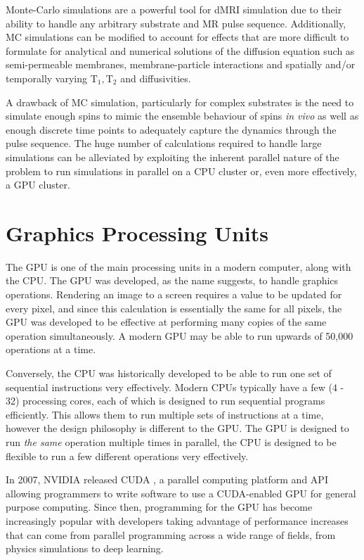 Monte-Carlo simulations are a powerful tool for \ac{dMRI} simulation due to their ability to handle any arbitrary substrate and MR pulse sequence.
Additionally, \ac{MC} simulations can be modified to account for effects that are more difficult to formulate for analytical and numerical solutions of the diffusion equation such as semi-permeable membranes, membrane-particle interactions and spatially and/or temporally varying $\mathrm{T_1, T_2}$ and diffusivities.

A drawback of \ac{MC} simulation, particularly for complex substrates is the need to simulate enough spins to mimic the ensemble behaviour of spins \emph{in vivo} as well as enough discrete time points to adequately capture the dynamics through the pulse sequence.
The huge number of calculations required to handle large simulations can be alleviated by exploiting the inherent parallel nature of the problem to run simulations in parallel on a \ac{CPU} cluster or, even more effectively, a \ac{GPU} cluster.



\section{Graphics Processing Units}
\label{sec:bg_gpu}

The \acf{GPU} is one of the main processing units in a modern computer, along with the \acf{CPU}.
The \ac{GPU} was developed, as the name suggests, to handle graphics operations.
Rendering an image to a screen requires a value to be updated for every pixel, and since this calculation is essentially the same for all pixels, the \ac{GPU} was developed to be effective at performing many copies of the same operation simultaneously.
A modern \ac{GPU} may be able to run upwards of 50,000 operations at a time.

Conversely, the \ac{CPU} was historically developed to be able to run one set of sequential instructions very effectively.
Modern \acp{CPU} typically have a few (4 - 32) processing cores, each of which is designed to run sequential programs efficiently.
This allows them to run multiple sets of instructions at a time, however the design philosophy is different to the \ac{GPU}.
The \ac{GPU} is designed to run \emph{the same} operation multiple times in parallel, the \ac{CPU} is designed to be flexible to run a few different operations very effectively. 

In 2007, NVIDIA released \ac{CUDA} \cite{Nickolls2008}, a parallel computing platform and \ac{API} allowing programmers to write software to use a \ac{CUDA}-enabled \ac{GPU} for general purpose computing.
Since then, programming for the \ac{GPU} has become increasingly popular with developers taking advantage of performance increases that can come from parallel programming across a wide range of fields, from physics simulations to deep learning. 

